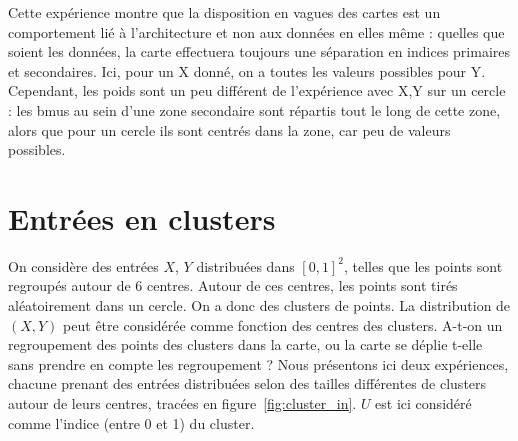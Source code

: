 Cette expérience montre que la disposition en vagues des cartes est un comportement lié à l'architecture et non aux données en elles même : quelles que soient les données, la carte effectuera toujours une séparation en indices primaires et secondaires. Ici, pour un X donné, on a toutes les valeurs possibles pour Y.
Cependant, les poids sont un peu différent de l'expérience avec X,Y sur un cercle : les bmus au sein d'une zone secondaire sont répartis tout le long de cette zone, alors que pour un cercle ils sont centrés dans la zone, car peu de valeurs possibles.


\section{Entrées en clusters}
On considère des entrées $X$, $Y$ distribuées dans $[0,1]^2$, telles que les points sont regroupés autour de 6 centres. Autour de ces centres, les points sont tirés aléatoirement dans un cercle. On a donc des clusters de points. La distribution de $(X,Y)$ peut être considérée comme fonction des centres des clusters.  A-t-on un regroupement des points des clusters dans la carte, ou la carte se déplie t-elle sans prendre en compte les regroupement ? Nous présentons ici deux expériences, chacune prenant des entrées distribuées selon des tailles différentes de clusters autour de leurs centres, tracées en figure~\ref{fig:cluster_in}.  $U$ est ici considéré comme l'indice (entre 0 et 1) du cluster.

